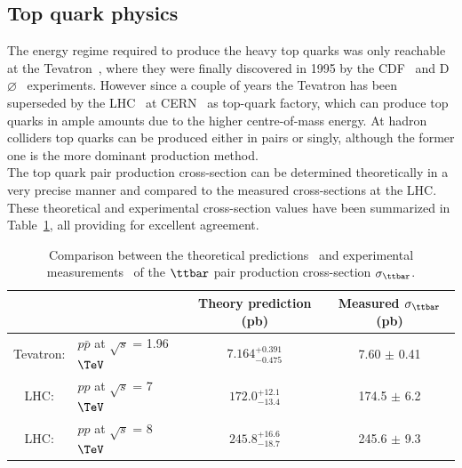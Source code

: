 \subsection{Top quark physics} 
The energy regime required to produce the heavy top quarks was only reachable at the Tevatron~\cite{Tevatron}, where they were finally discovered in 1995 by the CDF~\cite{CDF} and D$\varnothing$~\cite{D0} experiments. However since a couple of years the Tevatron has been superseded by the LHC~\cite{} at CERN~\cite{CERN} as top-quark factory, which can produce top quarks in ample amounts due to the higher centre-of-mass energy. %
At hadron colliders top quarks can be produced either in pairs or singly, although the former one is the more dominant production method.
\\
The top quark pair production cross-section can be determined theoretically in a very precise manner and compared to the measured cross-sections at the LHC. These theoretical and experimental cross-section values have been summarized in Table~\ref{table::XSTopPair}, all providing for excellent agreement. %
\begin{table}[h!t]
 \centering
 \caption{Comparison between the theoretical predictions~\cite{CzakonTopPairXS, CzakonGluonPDF} and experimental measurements~\cite{TevatronTTbarXS, CMSTTbarXS} of the $\ttbar$ pair production cross-section $\sigma_{\ttbar}$.} \label{table::XSTopPair}
 \begin{tabular}{|cl|c|c|}
  \hline
		&						& Theory prediction (pb) 	& Measured $\sigma_{\ttbar}$ (pb) 	\\
  \hline						
  Tevatron: 	& $p\bar{p}$ at $\sqrt{s}$ = 1.96 $\TeV$ 	& $7.164^{+0.391}_{-0.475}$	& 7.60 $\pm$ 0.41			\\
  LHC: 		& $pp$ at $\sqrt{s}$ = 7 $\TeV$ 		& $172.0^{+12.1}_{-13.4}$	& 174.5 $\pm$ 6.2			\\
  LHC: 		& $pp$ at $\sqrt{s}$ = 8 $\TeV$ 		& $245.8^{+16.6}_{-18.7}$	& 245.6 $\pm$ 9.3			\\
  \hline
 \end{tabular}
\end{table}

